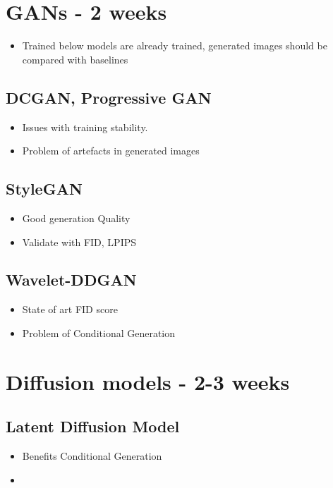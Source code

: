 \documentclass{article}
\begin{document}
    \section{GANs - 2 weeks}
    \begin{itemize}
        \item Trained below models are already trained, generated images should
            be compared with baselines
    \end{itemize}
    \subsection{DCGAN, Progressive GAN}
    \begin{itemize}
        \item Issues with training stability.

        \item Problem of artefacts in generated images
    \end{itemize}
    \subsection{StyleGAN}
    \begin{itemize}
        \item Good generation Quality

        \item Validate with FID, LPIPS
    \end{itemize}
    \subsection{Wavelet-DDGAN}
    \begin{itemize}
        \item State of art FID score

        \item Problem of Conditional Generation
    \end{itemize}

    \section{Diffusion models - 2-3 weeks}
    \subsection{Latent Diffusion Model}
    \begin{itemize}
        \item Benefits Conditional Generation

        \item
    \end{itemize}
\end{document}
